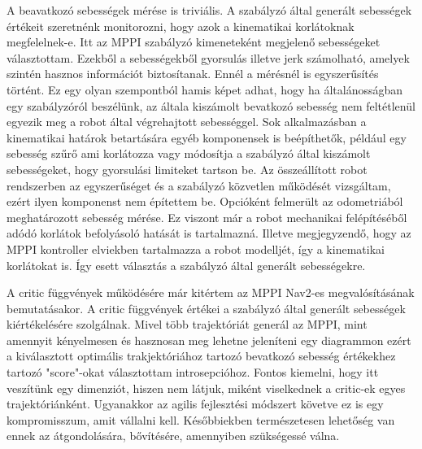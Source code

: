 A beavatkozó sebességek mérése is triviális. A szabályzó által generált sebességek értékeit szeretnénk monitorozni, hogy azok a kinematikai korlátoknak megfelelnek-e. Itt az MPPI szabályzó kimeneteként megjelenő sebességeket választottam. Ezekből a sebességekből gyorsulás illetve jerk számolható, amelyek szintén hasznos információt biztosítanak. Ennél a mérésnél is egyszerűsítés történt. Ez egy olyan szempontból hamis képet adhat, hogy ha általánosságban egy szabályzóról beszélünk, az általa kiszámolt bevatkozó sebesség nem feltétlenül egyezik meg a robot által végrehajtott sebességgel. Sok alkalmazásban a kinematikai határok betartására egyéb komponensek is beépíthetők, például egy sebesség szűrő ami korlátozza vagy módosítja a szabályzó által kiszámolt sebességeket, hogy gyorsulási limiteket tartson be. Az összeállított robot rendszerben az egyszerűséget és a szabályzó közvetlen működését vizsgáltam, ezért ilyen komponenst nem építettem be. Opcióként felmerült az odometriából meghatározott sebesség mérése. Ez viszont már a robot mechanikai felépítéséből adódó korlátok befolyásoló hatását is tartalmazná. Illetve megjegyzendő, hogy az MPPI kontroller elviekben tartalmazza a robot modelljét, így a kinematikai korlátokat is. Így esett választás a szabályzó által generált sebességekre.

A critic függvények működésére már kitértem az MPPI Nav2-es megvalósításának bemutatásakor. A critic függvények értékei a szabályzó által generált sebességek kiértékelésére szolgálnak. Mivel több trajektóriát generál az MPPI, mint amennyit kényelmesen és hasznosan meg lehetne jeleníteni egy diagrammon ezért a kiválasztott optimális trakjektóriához tartozó bevatkozó sebesség értékekhez tartozó "score"-okat választottam introsepcióhoz. Fontos kiemelni, hogy itt veszítünk egy dimenziót, hiszen nem látjuk, miként viselkednek a critic-ek egyes trajektóriánként. Ugyanakkor az agilis fejlesztési módszert követve ez is egy kompromisszum, amit vállalni kell. Későbbiekben természetesen lehetőség van ennek az átgondolására, bővítésére, amennyiben szükségessé válna.

